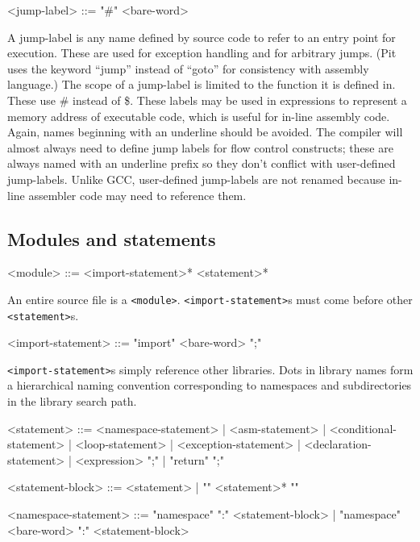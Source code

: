 \begin{sourcestyle}
\begin{verbatimtab}[\sourcetabsize]
<jump-label> ::= "#" <bare-word>
\end{verbatimtab}
\end{sourcestyle}

A jump-label is any name defined by source code to refer to an entry point for execution.  These are used for exception
handling and for arbitrary jumps.  (Pit uses the keyword ``jump'' instead of ``goto'' for consistency with assembly
language.)  The scope of a jump-label is limited to the function it is defined in.  These use \# instead of \$.  These
labels may be used in expressions to represent a memory address of executable code, which is useful for in-line
assembly code.  Again, names beginning with an underline should be avoided.  The compiler will almost always need to
define jump labels for flow control constructs; these are always named with an underline prefix so they don't conflict
with user-defined jump-labels.  Unlike GCC, user-defined jump-labels are not renamed because in-line assembler code may
need to reference them.

\subsection{Modules and statements}

\begin{sourcestyle}
\begin{verbatimtab}[\sourcetabsize]
<module> ::= <import-statement>* <statement>*
\end{verbatimtab}
\end{sourcestyle}

An entire source file is a \verb_<module>_.  \verb_<import-statement>_s must come before other \verb_<statement>_s.

\begin{sourcestyle}
\begin{verbatimtab}[\sourcetabsize]
<import-statement> ::= "import" <bare-word> ";"
\end{verbatimtab}
\end{sourcestyle}

\verb_<import-statement>_s simply reference other libraries.  Dots in library names form a hierarchical naming
convention corresponding to namespaces and subdirectories in the library search path.

\begin{sourcestyle}
\begin{verbatimtab}[\sourcetabsize]
<statement> ::= <namespace-statement>
| <asm-statement>
| <conditional-statement>
| <loop-statement>
| <exception-statement>
| <declaration-statement>
| <expression> ";"
| "return" ";"

<statement-block> ::= <statement>
| "{" <statement>* "}"

<namespace-statement> ::= "namespace" ":" <statement-block>
| "namespace" <bare-word> ":" <statement-block>
\end{verbatimtab}
\end{sourcestyle}

